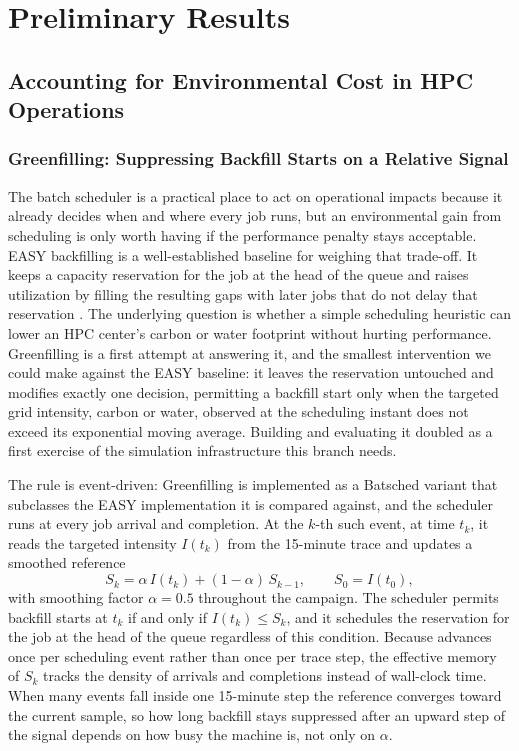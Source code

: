 \chapter{Preliminary Results}
\label{ch:preliminary}

\section{Accounting for Environmental Cost in HPC Operations}
\label{sec:preliminary-operations}

\subsection{Greenfilling: Suppressing Backfill Starts on a Relative Signal}

The batch scheduler is a practical place to act on operational impacts because it already decides when and where every job runs, but an environmental gain from scheduling is only worth having if the performance penalty stays acceptable. EASY backfilling is a well-established baseline for weighing that trade-off. It keeps a capacity reservation for the job at the head of the queue and raises utilization by filling the resulting gaps with later jobs that do not delay that reservation \parencite{skovira1996EASY, mualem2001Utilization}. The underlying question is whether a simple scheduling heuristic can lower an HPC center's carbon or water footprint without hurting performance. Greenfilling is a first attempt at answering it, and the smallest intervention we could make against the EASY baseline: it leaves the reservation untouched and modifies exactly one decision, permitting a backfill start only when the targeted grid intensity, carbon or water, observed at the scheduling instant does not exceed its exponential moving average. Building and evaluating it doubled as a first exercise of the simulation infrastructure this branch needs.

The rule is event-driven: Greenfilling is implemented as a Batsched variant that subclasses the EASY implementation it is compared against, and the scheduler runs at every job arrival and completion. At the $k$-th such event, at time $t_k$, it reads the targeted intensity $I(t_k)$ from the 15-minute trace and updates a smoothed reference
\begin{equation}
\label{eq:greenfilling-ema}
S_k = \alpha\, I(t_k) + (1 - \alpha)\, S_{k-1}, \qquad S_0 = I(t_0),
\end{equation}
with smoothing factor $\alpha = 0.5$ throughout the campaign. The scheduler permits backfill starts at $t_k$ if and only if $I(t_k) \le S_k$, and it schedules the reservation for the job at the head of the queue regardless of this condition. Because  advances once per scheduling event rather than once per trace step, the effective memory of $S_k$ tracks the density of arrivals and completions instead of wall-clock time. When many events fall inside one 15-minute step the reference converges toward the current sample, so how long backfill stays suppressed after an upward step of the signal depends on how busy the machine is, not only on $\alpha$.

